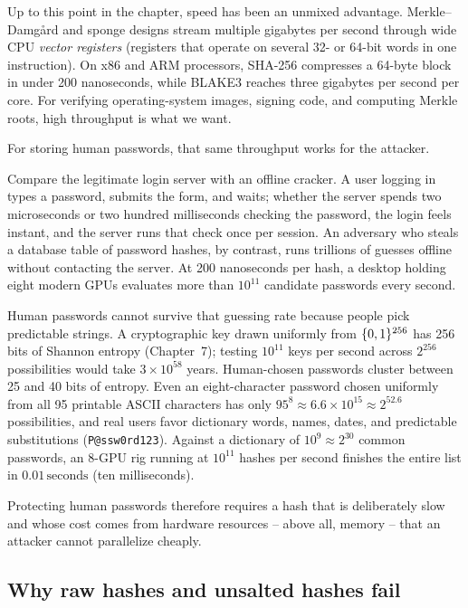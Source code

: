 Up to this point in the chapter, speed has been an unmixed advantage. Merkle--Damg\aa{}rd and sponge designs stream multiple gigabytes per second through wide CPU \emph{vector registers} (registers that operate on several 32- or 64-bit words in one instruction). On x86 and ARM processors, SHA-256 compresses a 64-byte block in under 200 nanoseconds, while BLAKE3 reaches three gigabytes per second per core. For verifying operating-system images, signing code, and computing Merkle roots, high throughput is what we want.

For storing human passwords, that same throughput works for the attacker.

Compare the legitimate login server with an offline cracker. A user logging in types a password, submits the form, and waits; whether the server spends two microseconds or two hundred milliseconds checking the password, the login feels instant, and the server runs that check once per session. An adversary who steals a database table of password hashes, by contrast, runs trillions of guesses offline without contacting the server. At 200 nanoseconds per hash, a desktop holding eight modern GPUs evaluates more than $10^{11}$ candidate passwords every second.

Human passwords cannot survive that guessing rate because people pick predictable strings. A cryptographic key drawn uniformly from $\{0,1\}^{256}$ has 256 bits of Shannon entropy (Chapter~7); testing $10^{11}$ keys per second across $2^{256}$ possibilities would take $3 \times 10^{58}$ years. Human-chosen passwords cluster between 25 and 40 bits of entropy. Even an eight-character password chosen uniformly from all 95 printable ASCII characters has only $95^8 \approx 6.6 \times 10^{15} \approx 2^{52.6}$ possibilities, and real users favor dictionary words, names, dates, and predictable substitutions (\texttt{P@ssw0rd123}). Against a dictionary of $10^9 \approx 2^{30}$ common passwords, an 8-GPU rig running at $10^{11}$ hashes per second finishes the entire list in $0.01\,\text{seconds}$ (ten milliseconds).

Protecting human passwords therefore requires a hash that is deliberately slow and whose cost comes from hardware resources -- above all, memory -- that an attacker cannot parallelize cheaply.

\subsection{Why raw hashes and unsalted hashes fail}

